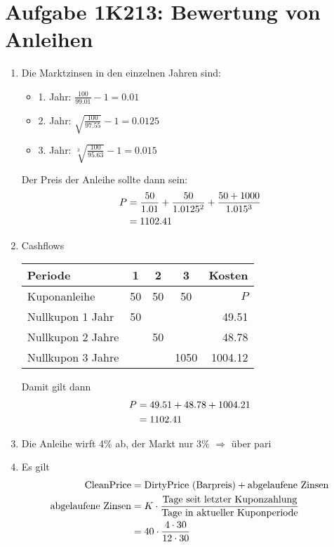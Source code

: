 \documentclass{article}
\begin{document}
	\section*{Aufgabe 1K213: Bewertung von Anleihen}
	\begin{enumerate}[label=(\alph*)]
		\item Die Marktzinsen in den einzelnen Jahren sind:
		\begin{itemize}
			\item 1. Jahr: $\frac{100}{99.01} -1 = 0.01$
			\item 2. Jahr: $\sqrt{\frac{100}{97.55}} -1 = 0.0125$
			\item 3. Jahr: $\sqrt[3]{\frac{100}{95.63}} - 1 = 0.015$
		\end{itemize}
		Der Preis der Anleihe sollte dann sein:
		\begin{align}
			P &= \frac{50}{1.01} + \frac{50}{1.0125^2} + \frac{50+1000}{1.015^3} \notag \\
			&= 1102.41 \notag
		\end{align}
		\item Cashflows
		\begin{center}
			\begin{tabular}{l|ccc|r}
				\textbf{Periode} & \textbf{1} & \textbf{2} & \textbf{3} & \textbf{Kosten} \\
				\hline
				Kuponanleihe & 50 & 50 & 50 & $P$ \\
				\hline
				Nullkupon 1 Jahr & 50 & & & 49.51 \\
				Nullkupon 2 Jahre & & 50 & & 48.78 \\
				Nullkupon 3 Jahre & & & 1050 & 1004.12
			\end{tabular}
		\end{center}
		Damit gilt dann
		\begin{align}
			P &= 49.51 + 48.78 + 1004.21 \notag \\
			&= 1102.41 \notag
		\end{align}
		\item Die Anleihe wirft 4\% ab, der Markt nur 3\% $\Rightarrow$ über pari
		\item Es gilt
		\begin{align}
			\text{CleanPrice} &= \text{DirtyPrice (Barpreis)} + \text{abgelaufene Zinsen} \notag \\
			\text{abgelaufene Zinsen} &= K \cdot \frac{\text{Tage seit letzter Kuponzahlung}}{\text{Tage in aktueller Kuponperiode}} \notag \\
			&= 40\cdot\frac{4\cdot 30}{12\cdot 30} \notag \\

\end{align}
\end{enumerate}
\end{document}
